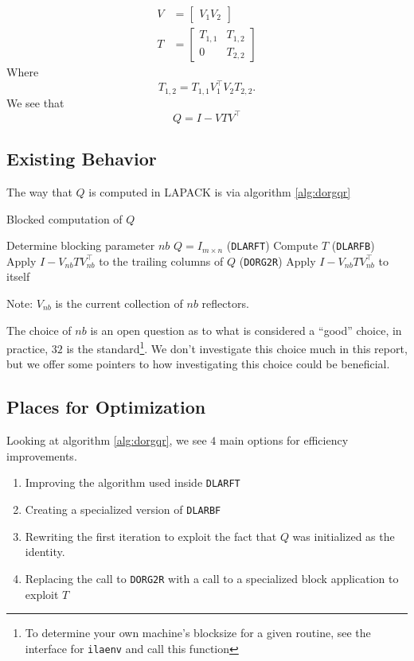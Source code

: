 \documentclass[12pt]{article}
\begin{document}
    \begin{align*}
        V &= \begin{bmatrix} V_1 V_2 \end{bmatrix}\\
        T &= \begin{bmatrix} 
            T_{1,1} & T_{1,2} \\
            0       & T_{2,2}
        \end{bmatrix}
    \end{align*}
    Where 
    $$
    T_{1,2} = T_{1,1}V_1^\top V_2T_{2,2}.
    $$
    We see that 
    \[
        Q = I - VTV^\top
    \]
    \subsection{Existing Behavior}
    The way that $Q$ is computed in LAPACK is via algorithm \ref{alg:dorgqr}

    \begin{algorithm}
        \caption{Blocked computation of $Q$}\label{alg:dorgqr}
        \begin{algorithmic}[1]
            \STATE Determine blocking parameter $nb$
            \STATE $Q = I_{m\times n}$
                \STATE (\verb|DLARFT|) Compute $T$
                \STATE (\verb|DLARFB|) Apply $I-V_{nb}TV_{nb}^\top$ to the trailing columns of $Q$
                \STATE (\verb|DORG2R|) Apply $I-V_{nb}TV_{nb}^\top$ to itself
            \ENDFOR
        \end{algorithmic}
    \end{algorithm}

    Note: $V_{nb}$ is the current collection of $nb$ reflectors.

    The choice of $nb$ is an open question as to what is considered a ``good'' choice, in practice, $32$ is 
    the standard\footnote{To determine your own machine's blocksize for a given routine, see the interface for 
    \verb+ilaenv+ and call this function}. We don't investigate this choice much in this report, but we offer 
    some pointers to how investigating this choice could be beneficial.
    \subsection{Places for Optimization}
    Looking at algorithm \ref{alg:dorgqr}, we see $4$ main options for efficiency improvements. 
    \begin{enumerate}
        \item Improving the algorithm used inside \verb|DLARFT|
        \item Creating a specialized version of \verb|DLARBF|
        \item Rewriting the first iteration to exploit the fact that $Q$ was initialized as the identity.
        \item Replacing the call to \verb|DORG2R| with a call to a specialized block application to exploit $T$
    \end{enumerate}
\end{document}
